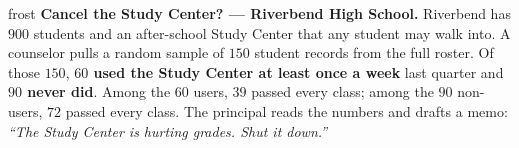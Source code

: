 \documentclass[10pt]{article}
\begin{document}

\vspace{0.15in}

\begin{headlinebox}{frost}
\small
\textbf{Cancel the Study Center? --- Riverbend High School.} Riverbend has $900$
students and an after-school Study Center that any student may walk into. A
counselor pulls a random sample of $150$ student records from the full roster.
Of those $150$, \textbf{$60$ used the Study Center at least once a week} last
quarter and \textbf{$90$ never did}. Among the $60$ users, $39$ passed every
class; among the $90$ non-users, $72$ passed every class. The principal reads
the numbers and drafts a memo: \emph{``The Study Center is hurting grades. Shut
it down.''}
\end{headlinebox}

\vspace{0.03in}
\end{document}
